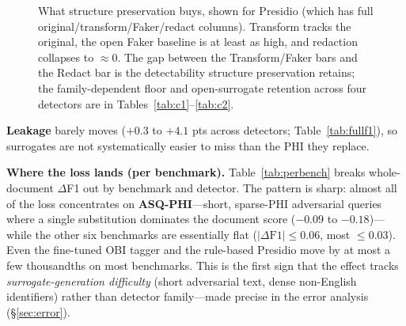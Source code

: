 \documentclass[11pt]{article}
\begin{document}
\begin{figure}[t]
\centering
{}
\caption{What structure preservation buys, shown for Presidio (which has full original/transform/Faker/redact columns). Transform tracks the original, the open Faker baseline is at least as high, and redaction collapses to $\approx$0. The gap between the Transform/Faker bars and the Redact bar is the detectability structure preservation retains; the family-dependent floor and open-surrogate retention across four detectors are in Tables~\ref{tab:c1}--\ref{tab:c2}.}
\label{fig:bars}
\end{figure}

\textbf{Leakage} barely moves ($+0.3$ to $+4.1$ pts across detectors; Table~\ref{tab:fullf1}), so surrogates are not systematically easier to miss than the PHI they replace.

\textbf{Where the loss lands (per benchmark).} Table~\ref{tab:perbench} breaks whole-document $\Delta$F1 out by benchmark and detector. The pattern is sharp: almost all of the loss concentrates on \textbf{ASQ-PHI}---short, sparse-PHI adversarial queries where a single substitution dominates the document score ($-0.09$ to $-0.18$)---while the other six benchmarks are essentially flat ($|\Delta\text{F1}|\le0.06$, most $\le0.03$). Even the fine-tuned OBI tagger and the rule-based Presidio move by at most a few thousandths on most benchmarks. This is the first sign that the effect tracks \emph{surrogate-generation difficulty} (short adversarial text, dense non-English identifiers) rather than detector family---made precise in the error analysis (\S\ref{sec:error}).
\end{document}
